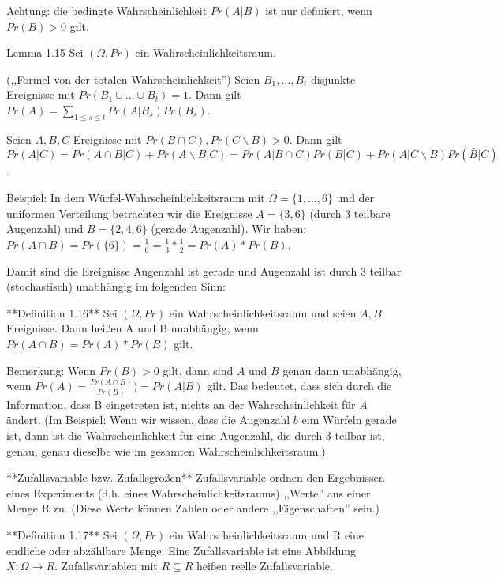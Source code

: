 \documentclass[a4paper]{article}
\begin{document}
\begin{multicols}{3}
    Achtung: die bedingte Wahrscheinlichkeit $Pr(A|B)$ ist nur definiert, wenn $Pr(B)> 0$ gilt.

    Lemma 1.15 Sei $(\Omega,Pr)$ ein Wahrscheinlichkeitsraum.
    \begin{enumerate*}
        \item (,,Formel von der totalen Wahrscheinlichkeit'') Seien $B_1,...,B_t$ disjunkte Ereignisse mit $Pr(B_1\cup...\cup B_t)=1$. Dann gilt $Pr(A)=\sum_{1\leq s\leq t} Pr(A|B_s)Pr(B_s)$.
        \item Seien $A,B,C$ Ereignisse mit $Pr(B\cap C),Pr(C\backslash B)>0$. Dann gilt $Pr(A|C)=Pr(A\cap B | C) + Pr(A\backslash B|C)= Pr(A|B\cap C)Pr(B|C) + Pr(A|C\backslash B)Pr(\bar{B}|C)$.
    \end{enumerate*}

    Beispiel: In dem Würfel-Wahrscheinlichkeitsraum mit $\Omega=\{1,...,6\}$ und der uniformen Verteilung betrachten wir die Ereignisse $A=\{3,6\}$ (durch 3 teilbare Augenzahl) und $B=\{2,4,6\}$ (gerade Augenzahl). Wir haben: $Pr(A\cap B) = Pr(\{6\})=\frac{1}{6}=\frac{1}{3}*\frac{1}{2}=Pr(A)*Pr(B)$.

    Damit sind die Ereignisse {Augenzahl ist gerade} und {Augenzahl ist durch 3 teilbar} (stochastisch) unabhängig im folgenden Sinn:

    **Definition 1.16** Sei $(\Omega,Pr)$ ein Wahrscheinlichkeitsraum und seien $A,B$ Ereignisse. Dann heißen A und B unabhängig, wenn $Pr(A\cap B)=Pr(A)*Pr(B)$ gilt.

    Bemerkung: Wenn $Pr(B)> 0$ gilt, dann sind $A$ und $B$ genau dann unabhängig, wenn $Pr(A) = \frac{Pr(A\cap B)}{Pr(B)})= Pr(A|B)$ gilt. Das bedeutet, dass sich durch die Information, dass B eingetreten ist, nichts an der Wahrscheinlichkeit für $A$ ändert. (Im Beispiel: Wenn wir wissen, dass die Augenzahl $b$  eim Würfeln gerade ist, dann ist die Wahrscheinlichkeit für eine Augenzahl, die durch 3 teilbar ist, genau, genau dieselbe wie im gesamten Wahrscheinlichkeitsraum.)

    **Zufallsvariable bzw. Zufallsgrößen** Zufallsvariable ordnen den Ergebnissen eines Experiments (d.h. eines Wahrscheinlichkeitsraums) ,,Werte''  aus einer Menge R zu. (Diese Werte können Zahlen oder andere ,,Eigenschaften'' sein.)

    **Definition 1.17** Sei $(\Omega,Pr)$ ein Wahrscheinlichkeitsraum und R eine endliche oder abzählbare Menge. Eine Zufallsvariable ist eine Abbildung $X:\Omega\rightarrow R$.
    Zufallsvariablen mit $R\subseteq R$ heißen reelle Zufallsvariable.


\end{multicols}
\end{document}
